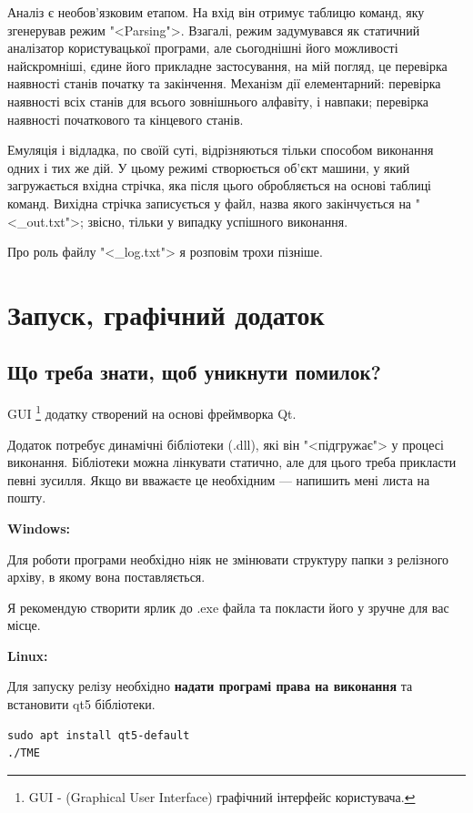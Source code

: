 \documentclass[oneside,final,14pt]{extreport}
\begin{document}
Аналіз є необов'язковим етапом. На вхід він отримує таблицю команд, яку згенерував режим "<Parsing">. Взагалі, режим задумувався як статичний аналізатор користувацької програми, але сьогоднішні його можливості найскромніші, єдине його прикладне застосування, на мій погляд, це перевірка наявності станів початку та закінчення. Механізм дії елементарний: перевірка наявності всіх станів для всього зовнішнього алфавіту, і навпаки; перевірка наявності початкового та кінцевого станів.

Емуляція і відладка, по своїй суті, відрізняються тільки способом виконання одних і тих же дій. У цьому режимі створюється об'єкт машини, у який загружається вхідна стрічка, яка після цього обробляється на основі таблиці команд. Вихідна стрічка записується у файл, назва якого закінчується на "<\_out.txt">; звісно, тільки у випадку успішного виконання.

Про роль файлу "<\_log.txt"> я розповім трохи пізніше.

\chapter{Запуск, графічний додаток}
\section{Що треба знати, щоб уникнути помилок?}
GUI
\footnote{GUI - (Graphical User Interface) графічний інтерфейс користувача.}
 додатку створений на основі фреймворка Qt.

Додаток потребує динамічні бібліотеки (.dll), які він "<підгружає"> у процесі виконання. 
Бібліотеки можна лінкувати статично, але для цього треба прикласти певні зусилля. Якщо ви вважаєте це необхідним --- напишить мені листа на пошту.

\textbf{Windows:}

Для роботи програми необхідно ніяк не змінювати структуру папки з релізного архіву, в якому вона поставляється.

Я рекомендую створити ярлик до .exe файла та покласти його у зручне для вас місце.

\textbf{Linux:}

Для запуску релізу необхідно \textbf{надати програмі права на виконання} та встановити qt5 бібліотеки.
\begin{tcolorbox}	
\begin{verbatim}
sudo apt install qt5-default
./TME
\end{verbatim}
\end{tcolorbox}
\end{document}

